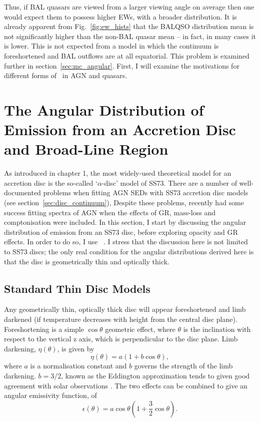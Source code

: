 Thus, if BAL quasars are viewed from a larger viewing angle on average then one
would expect them to possess higher EWs, with a broader distribution.
It is already apparent from Fig.~\ref{fig:ew_hists} that the BALQSO distribution mean 
is not significantly higher than the non-BAL quasar
mean -- in fact, in many cases it is lower. This is not expected from a model
in which the continuum is foreshortened and BAL outflows are at all equatorial.
This problem is examined further in section~\ref{sec:mc_angular}. 
First, I will examine the motivations for different forms of \ept\ 
in AGN and quasars.

\section{The Angular Distribution of Emission from an Accretion Disc and Broad-Line Region}
\label{sec:disc_agn}

\noindent 
As introduced in chapter 1, the most widely-used theoretical model for an accretion disc
is the so-called `$\alpha$-disc' model of SS73. 
There are a number of well-documented problems when fitting 
AGN SEDs with SS73 accretion disc models (see section~\ref{sec:disc_continuum}), 
Despite these problems, \cite{capellupo2015} recently had 
some success fitting spectra of AGN when the effects of
GR, mass-loss and comptonisation were included.
In this section, I start by discussing the angular distribution of
emission from an SS73 disc, before exploring opacity and GR 
effects. In order to do so, I use \agn\
\citep{hubeny2000,davishubeny2006,davis2007}. I stress that the 
discussion here is not limited to SS73 discs; the only real condition
for the angular distributions derived here is that the 
disc is geometrically thin and optically thick.

\subsection{Standard Thin Disc Models}

\noindent
Any geometrically thin, optically thick disc will appear
foreshortened and limb darkened (if temperature decreases
with height from the central disc plane). 
Foreshortening is a simple $\cos \theta$ geometric effect, 
where $\theta$ is the inclination with respect to the vertical z axis, which
is perpendicular to the disc plane.
Limb darkening, $\eta(\theta)$, is given by
\begin{equation}
\eta(\theta) = a \left( 1 + b \cos \theta \right),
\end{equation}
where $a$ is a normalisation constant and $b$ governs the strength
of the limb darkening. $b=3/2$, known as the Eddington approximation
tends to given good agreement with solar observations 
\citep[e.g.][]{mihalas}. The two effects can be 
combined to give an angular emissivity function, of
\begin{equation}
\epsilon(\theta) = a \cos \theta \left( 1 + \frac{3}{2} \cos \theta \right).
\end{equation}

